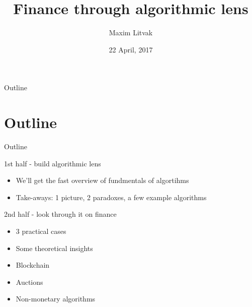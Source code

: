 \documentclass[presentation]{beamer}
\author{Maxim Litvak}
\date{22 April, 2017}
\title{Finance through algorithmic lens}
\begin{document}
\maketitle
\begin{frame}{Outline}
\tableofcontents
\end{frame}

\section{Outline}
\label{sec-1}
\begin{frame}[label=sec-1-1]{Outline}
\begin{block}{1st half - build algorithmic lens}
\begin{itemize}
\item We'll get the fast overview of fundmentals of algortihms
\item Take-aways: 1 picture, 2 paradoxes, a few example algorithms
\end{itemize}
\end{block}
\begin{block}{2nd half - look through it on finance}
\begin{itemize}
\item 3 practical cases
\item Some theoretical insights
\item Blockchain
\item Auctions
\item Non-monetary algorithms
\end{itemize}
\end{block}
\end{frame}
\end{document}
